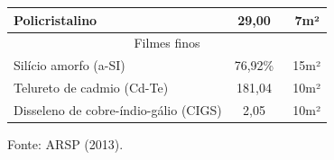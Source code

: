 \begin{onehalfspace}
\begin{table}[ht]
\begin{tabular}{lcc}
            Policristalino                          & 29,00                         & ~7m²              \\ \hline
            \multicolumn{3}{c}{Filmes finos}                                                          \\ \hline
            Silício amorfo (a-SI)                   & 76,92\%                       & ~15m²             \\ \hline
            Telureto de cadmio (Cd-Te)              & 181,04                        & ~10m²             \\ \hline
            Disseleno de cobre-índio-gálio (CIGS)   & 2,05                          & ~10m²             \\ \hline
            \end{tabular}
            \begin{flushleft}
                \par \small Fonte: ARSP (2013).\vspace{-0.85cm}
            \end{flushleft}
        \end{table}

\end{onehalfspace}
